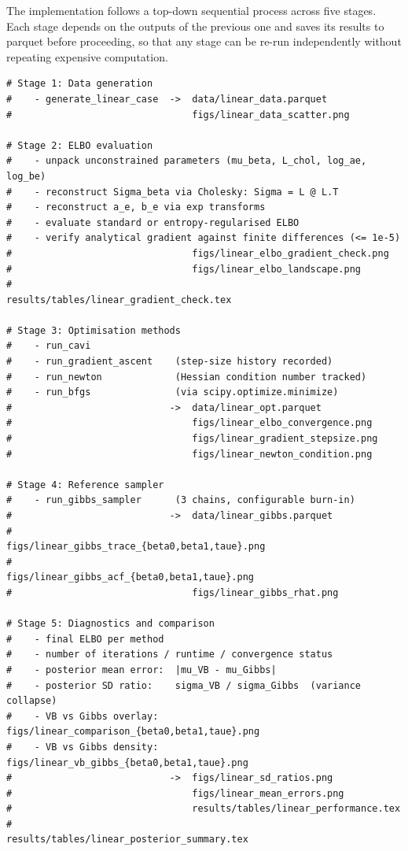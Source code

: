 \documentclass[11pt,a4paper]{article}
\begin{document}
The implementation follows a top-down sequential process across five stages.
Each stage depends on the outputs of the previous one and saves its results to parquet before proceeding,
so that any stage can be re-run independently without repeating expensive computation.

\begin{verbatim}
# Stage 1: Data generation
#    - generate_linear_case  ->  data/linear_data.parquet
#                                figs/linear_data_scatter.png

# Stage 2: ELBO evaluation
#    - unpack unconstrained parameters (mu_beta, L_chol, log_ae, log_be)
#    - reconstruct Sigma_beta via Cholesky: Sigma = L @ L.T
#    - reconstruct a_e, b_e via exp transforms
#    - evaluate standard or entropy-regularised ELBO
#    - verify analytical gradient against finite differences (<= 1e-5)
#                                figs/linear_elbo_gradient_check.png
#                                figs/linear_elbo_landscape.png
#                                results/tables/linear_gradient_check.tex

# Stage 3: Optimisation methods
#    - run_cavi
#    - run_gradient_ascent    (step-size history recorded)
#    - run_newton             (Hessian condition number tracked)
#    - run_bfgs               (via scipy.optimize.minimize)
#                            ->  data/linear_opt.parquet
#                                figs/linear_elbo_convergence.png
#                                figs/linear_gradient_stepsize.png
#                                figs/linear_newton_condition.png

# Stage 4: Reference sampler
#    - run_gibbs_sampler      (3 chains, configurable burn-in)
#                            ->  data/linear_gibbs.parquet
#                                figs/linear_gibbs_trace_{beta0,beta1,taue}.png
#                                figs/linear_gibbs_acf_{beta0,beta1,taue}.png
#                                figs/linear_gibbs_rhat.png

# Stage 5: Diagnostics and comparison
#    - final ELBO per method
#    - number of iterations / runtime / convergence status
#    - posterior mean error:  |mu_VB - mu_Gibbs|
#    - posterior SD ratio:    sigma_VB / sigma_Gibbs  (variance collapse)
#    - VB vs Gibbs overlay:   figs/linear_comparison_{beta0,beta1,taue}.png
#    - VB vs Gibbs density:   figs/linear_vb_gibbs_{beta0,beta1,taue}.png
#                            ->  figs/linear_sd_ratios.png
#                                figs/linear_mean_errors.png
#                                results/tables/linear_performance.tex
#                                results/tables/linear_posterior_summary.tex
\end{verbatim}
\end{document}
